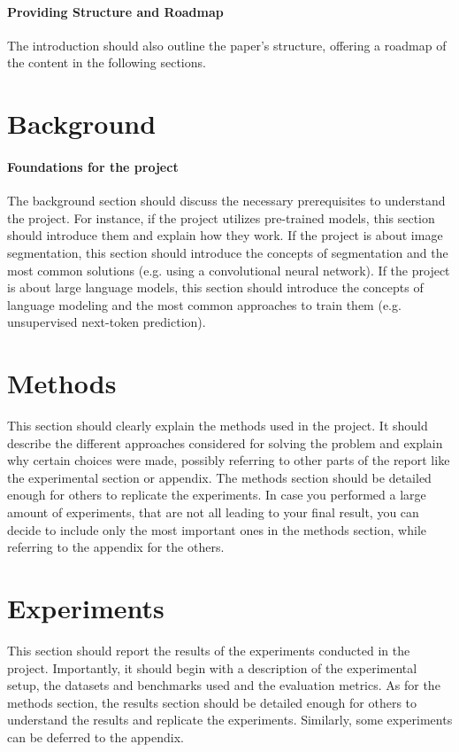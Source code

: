 \documentclass{article}
\begin{document}
\paragraph{Providing Structure and Roadmap}
The introduction should also outline the paper's structure, offering a roadmap of the content in the following sections.


\section{Background}
\paragraph{Foundations for the project}
The background section should discuss the necessary prerequisites to understand the project. For instance, if the project utilizes pre-trained models, this section should introduce them and explain how they work. If the project is about image segmentation, this section should introduce the concepts of segmentation and the most common solutions (e.g. using a convolutional neural network). If the project is about large language models, this section should introduce the concepts of language modeling and the most common approaches to train them (e.g. unsupervised next-token prediction).

\section{Methods}
This section should clearly explain the methods used in the project. It should describe the different approaches considered for solving the problem and explain why certain choices were made, possibly referring to other parts of the report like the experimental section or appendix. The methods section should be detailed enough for others to replicate the experiments. In case you performed a large amount of experiments, that are not all leading to your final result, you can decide to include only the most important ones in the methods section, while referring to the appendix for the others.

\section{Experiments}
This section should report the results of the experiments conducted in the project. Importantly, it should begin with a description of the experimental setup, the datasets and benchmarks used and the evaluation metrics. As for the methods section, the results section should be detailed enough for others to understand the results and replicate the experiments. Similarly, some experiments can be deferred to the appendix.
\end{document}

